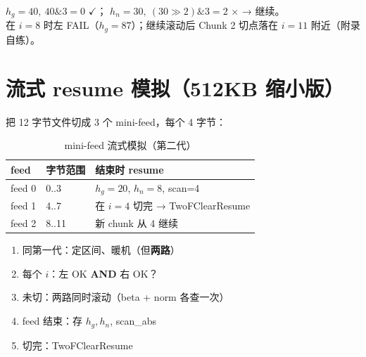 \begin{simbox}[Chunk 2 在 $i=7$：左 OK 右 FAIL]
$h_g=40,\ 40\&3=0$ \quad$\checkmark$；\quad
$h_n=30,\ (30\gg2)\&3=2$ \quad$\times$ → 继续。\\
在 $i=8$ 时左 FAIL（$h_g=87$）；继续滚动后 Chunk 2 切点落在 $i=11$ 附近（附录自练）。
\end{simbox}

\section{流式 resume 模拟（512KB 缩小版）}

把 12 字节文件切成 3 个 mini-feed，每个 4 字节：

\begin{table}[htbp]
\centering
\caption{mini-feed 流式模拟（第二代）}
\small
\begin{tabular}{@{}lll@{}}
\toprule
\textbf{feed} & \textbf{字节范围} & \textbf{结束时 resume} \\
\midrule
feed 0 & 0..3 & $h_g=20$, $h_n=8$, scan=4 \\
feed 1 & 4..7 & 在 $i=4$ 切完 → TwoFClearResume \\
feed 2 & 8..11 & 新 chunk 从 4 继续 \\
\bottomrule
\end{tabular}
\end{table}

\begin{gentwobox}
\begin{enumerate}[nosep]
  \item 同第一代：定区间、暖机（但\textbf{两路}）
  \item 每个 $i$：左 OK \textbf{AND} 右 OK？
  \item 未切：两路同时滚动（beta + norm 各查一次）
  \item feed 结束：存 $h_g, h_n$, scan\_abs
  \item 切完：TwoFClearResume
\end{enumerate}
\end{gentwobox}
